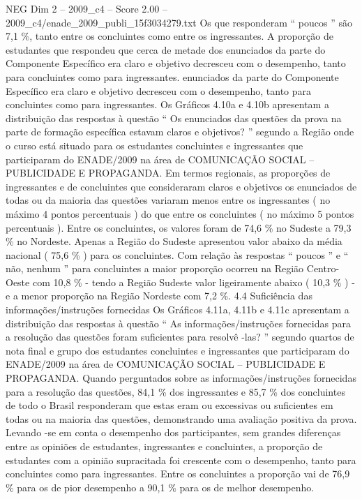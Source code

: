\begin{textsample}{NEG Dim 2 – 2009\_c4 – Score 2.00 – 2009\_c4/enade\_2009\_publi\_15f3034279.txt}
Os que responderam “ poucos ” são 7,1 \%, tanto entre os concluintes como entre os ingressantes.
A proporção de estudantes que respondeu que cerca de metade dos enunciados da parte do Componente Específico era claro e objetivo decresceu com o desempenho, tanto para concluintes como para ingressantes. enunciados da parte do Componente Específico era claro e objetivo decresceu com o desempenho, tanto para concluintes como para ingressantes.
Os Gráficos 4.10a e 4.10b apresentam a distribuição das respostas à questão “ Os enunciados das questões da prova na parte de formação específica estavam claros e objetivos? ” segundo a Região onde o curso está situado para os estudantes concluintes e ingressantes que participaram do ENADE/2009 na área de COMUNICAÇÃO SOCIAL – PUBLICIDADE E PROPAGANDA.
Em termos regionais, as proporções de ingressantes e de concluintes que consideraram claros e objetivos os enunciados de todas ou da maioria das questões variaram menos entre os ingressantes ( no máximo 4 pontos percentuais ) do que entre os concluintes ( no máximo 5 pontos percentuais ).
Entre os concluintes, os valores foram de 74,6 \% no Sudeste a 79,3 \% no Nordeste.
Apenas a Região do Sudeste apresentou valor abaixo da média nacional ( 75,6 \% ) para os concluintes.
Com relação às respostas “ poucos ” e “ não, nenhum ” para concluintes a maior proporção ocorreu na Região Centro-Oeste com 10,8 \% - tendo a Região Sudeste valor ligeiramente abaixo ( 10,3 \% ) - e a menor proporção na Região Nordeste com 7,2 \%. 4.4 Suficiência das informações/instruções fornecidas Os Gráficos 4.11a, 4.11b e 4.11c apresentam a distribuição das respostas à questão “ As informações/instruções fornecidas para a resolução das questões foram suficientes para resolvê -las? ” segundo quartos de nota final e grupo dos estudantes concluintes e ingressantes que participaram do ENADE/2009 na área de COMUNICAÇÃO SOCIAL – PUBLICIDADE E PROPAGANDA.
Quando perguntados sobre as informações/instruções fornecidas para a resolução das questões, 84,1 \% dos ingressantes e 85,7 \% dos concluintes de todo o Brasil responderam que estas eram ou excessivas ou suficientes em todas ou na maioria das questões, demonstrando uma avaliação positiva da prova.
Levando -se em conta o desempenho dos participantes, sem grandes diferenças entre as opiniões de estudantes, ingressantes e concluintes, a proporção de estudantes com a opinião supracitada foi crescente com o desempenho, tanto para concluintes como para ingressantes.
Entre os concluintes a proporção vai de 76,9 \% para os de pior desempenho a 90,1 \% para os de melhor desempenho.

\end{textsample}
